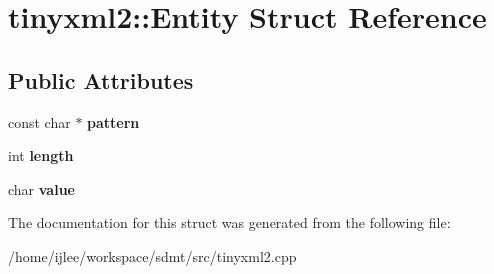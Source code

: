 \hypertarget{structtinyxml2_1_1_entity}{}\section{tinyxml2\+:\+:Entity Struct Reference}
\label{structtinyxml2_1_1_entity}
\subsection*{Public Attributes}
\begin{DoxyCompactItemize}
\item 
\mbox{\label{structtinyxml2_1_1_entity_ab330f5d665d29bfc811ecfa76315894b}} 
const char $\ast$ {\bfseries pattern}
\item 
\mbox{\label{structtinyxml2_1_1_entity_a25e2b57cb59cb4fa68f283d7cb570f21}} 
int {\bfseries length}
\item 
\mbox{\label{structtinyxml2_1_1_entity_a7334e81e33b4615655a403711b24f3ed}} 
char {\bfseries value}
\end{DoxyCompactItemize}


The documentation for this struct was generated from the following file\+:\begin{DoxyCompactItemize}
\item 
/home/ijlee/workspace/sdmt/src/tinyxml2.\+cpp\end{DoxyCompactItemize}
